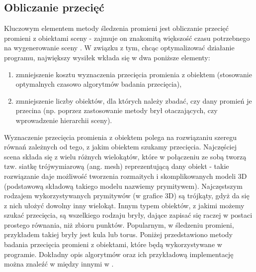 \subsection{Obliczanie przecięć}

Kluczowym elementem metody śledzenia promieni jest obliczanie przecięć promieni z obiektami sceny - zajmuje on znakomitą większość czasu potrzebnego na  wygenerowanie sceny \cite{suffern2007}. W związku z tym, chcąc optymalizować działanie programu, największy wysiłek wkłada się w dwa poniższe elementy:

\begin{enumerate}

\item zmniejszenie kosztu wyznaczenia przecięcia promienia z obiektem (stosowanie optymalnych czasowo algorytmów badania przecięcia),

\item zmniejszenie liczby obiektów, dla których należy zbadać, czy dany promień je przecina (np. poprzez zastosowanie metody brył otaczających, czy wprowadzenie hierarchii sceny).

\end{enumerate}

Wyznaczenie przecięcia promienia z obiektem polega na rozwiązaniu szeregu równań zależnych od tego, z jakim obiektem szukamy przecięcia. Najczęściej scena składa się z wielu różnych wielokątów, które w połączeniu ze sobą tworzą tzw. siatkę trójwymiarową (ang. mesh) reprezentującą dany obiekt - takie rozwiązanie daje możliwość tworzenia rozmaitych i skomplikowanych modeli 3D (podstawową składową takiego modelu nazwiemy prymitywem). Najczęstszym rodzajem wykorzystywanych prymitywów (w grafice 3D) są trójkąty, gdyż da się z nich ułożyć dowolny inny wielokąt. Innym typem obiektów, z jakimi możemy szukać przecięcia, są wszelkiego rodzaju bryły, dające zapisać się raczej w postaci prostego równania, niż zbioru punktów. Popularnym, w śledzeniu promieni, przykładem takiej bryły jest kula lub torus. Poniżej przedstawiono metody badania przecięcia promieni z obiektami, które będą wykorzystywane w programie. Dokładny opis algorytmów oraz ich przykładową implementację można znaleźć w między innymi w \cite{dunn02, scratch}.

